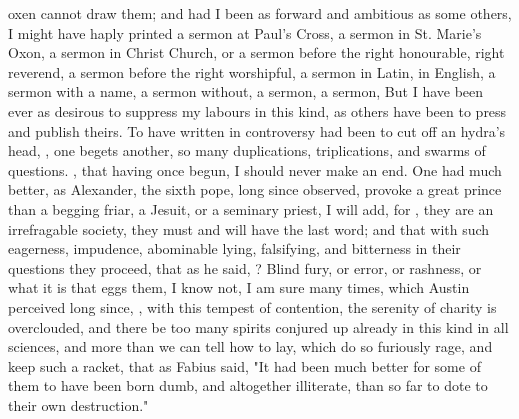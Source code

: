 oxen cannot draw them; and had I been as forward and ambitious as some others,
I might have haply printed a sermon at Paul's Cross, a sermon in St. Marie's
Oxon, a sermon in Christ Church, or a sermon before the right honourable, right
reverend, a sermon before the right worshipful, a sermon in Latin, in English,
a sermon with a name, a sermon without, a sermon, a sermon, \etc{} But I have
been ever as desirous to suppress my labours in this kind, as others have been
to press and publish theirs. To have written in controversy had been to cut off
an hydra's head, , one begets
another, so many duplications, triplications, and swarms of questions. , that having once begun, I should
never make an end. One had much better, as Alexander, the
sixth pope, long since observed, provoke a great prince than a begging friar, a
Jesuit, or a seminary priest, I will add, for , they are an irrefragable society, they must and will have the last
word; and that with such eagerness, impudence, abominable lying, falsifying,
and bitterness in their questions they proceed, that as he
said, ? Blind fury, or error, or rashness, or what it is that eggs
them, I know not, I am sure many times, which Austin
perceived long since, , with this tempest of contention, the serenity of charity is
overclouded, and there be too many spirits conjured up already in this kind in
all sciences, and more than we can tell how to lay, which do so furiously rage,
and keep such a racket, that as Fabius said, "It had been
much better for some of them to have been born dumb, and altogether illiterate,
than so far to dote to their own destruction."



